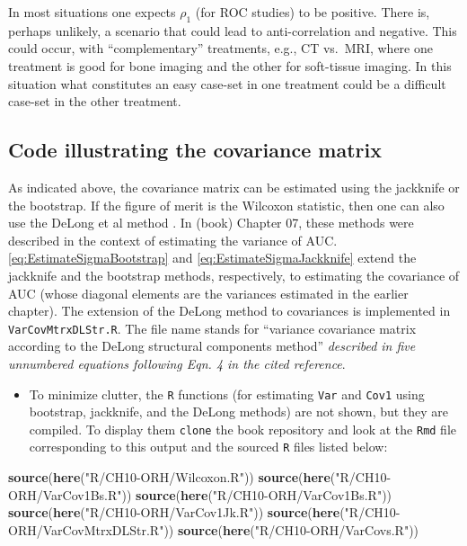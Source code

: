 \documentclass[
]{book}
\newenvironment{Shaded}{\begin{snugshade}}{\end{snugshade}}
\newcommand{\KeywordTok}[1]{\textcolor[rgb]{0.13,0.29,0.53}{\textbf{#1}}}
\newcommand{\NormalTok}[1]{#1}
\newcommand{\StringTok}[1]{\textcolor[rgb]{0.31,0.60,0.02}{#1}}
\providecommand{\tightlist}{%
  \setlength{\itemsep}{0pt}\setlength{\parskip}{0pt}}
\begin{document}
In most situations one expects \(\rho_1\) (for ROC studies) to be positive. There is, perhaps unlikely, a scenario that could lead to anti-correlation and negative. This could occur, with ``complementary'' treatments, e.g., CT vs.~MRI, where one treatment is good for bone imaging and the other for soft-tissue imaging. In this situation what constitutes an easy case-set in one treatment could be a difficult case-set in the other treatment.

\hypertarget{code-illustrating-the-covariance-matrix}{%
\subsection{Code illustrating the covariance matrix}\label{code-illustrating-the-covariance-matrix}}

As indicated above, the covariance matrix can be estimated using the jackknife or the bootstrap. If the figure of merit is the Wilcoxon statistic, then one can also use the DeLong et al method \citep{RN112}. In (book) Chapter 07, these methods were described in the context of estimating the variance of AUC. \eqref{eq:EstimateSigmaBootstrap} and \eqref{eq:EstimateSigmaJackknife} extend the jackknife and the bootstrap methods, respectively, to estimating the covariance of AUC (whose diagonal elements are the variances estimated in the earlier chapter). The extension of the DeLong method to covariances is implemented in \texttt{VarCovMtrxDLStr.R}. The file name stands for ``variance covariance matrix according to the DeLong structural components method'' \emph{described in five unnumbered equations following Eqn. 4 in the cited reference}.

\begin{itemize}
\tightlist
\item
  To minimize clutter, the \texttt{R} functions (for estimating \texttt{Var} and \texttt{Cov1} using bootstrap, jackknife, and the DeLong methods) are not shown, but they are compiled. To display them \texttt{clone} the book repository and look at the \texttt{Rmd} file corresponding to this output and the sourced \texttt{R} files listed below:
\end{itemize}

\begin{Shaded}
\begin{Highlighting}[]
\KeywordTok{source}\NormalTok{(}\KeywordTok{here}\NormalTok{(}\StringTok{"R/CH10{-}ORH/Wilcoxon.R"}\NormalTok{))}
\KeywordTok{source}\NormalTok{(}\KeywordTok{here}\NormalTok{(}\StringTok{"R/CH10{-}ORH/VarCov1Bs.R"}\NormalTok{))}
\KeywordTok{source}\NormalTok{(}\KeywordTok{here}\NormalTok{(}\StringTok{"R/CH10{-}ORH/VarCov1Bs.R"}\NormalTok{))}
\KeywordTok{source}\NormalTok{(}\KeywordTok{here}\NormalTok{(}\StringTok{"R/CH10{-}ORH/VarCov1Jk.R"}\NormalTok{)) }
\KeywordTok{source}\NormalTok{(}\KeywordTok{here}\NormalTok{(}\StringTok{"R/CH10{-}ORH/VarCovMtrxDLStr.R"}\NormalTok{))}
\KeywordTok{source}\NormalTok{(}\KeywordTok{here}\NormalTok{(}\StringTok{"R/CH10{-}ORH/VarCovs.R"}\NormalTok{))}
\end{Highlighting}
\end{Shaded}
\end{document}
